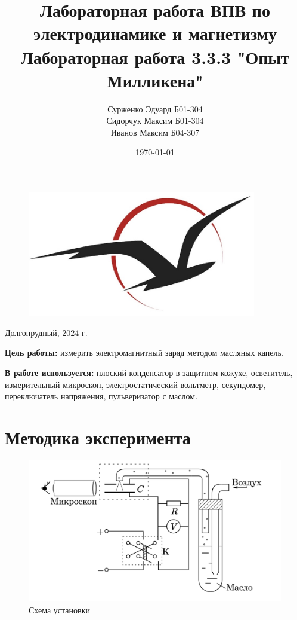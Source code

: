 \documentclass{lab}
\title {Лабораторная работа }
\author {}
\date{\today}
\begin{document}
\begin{titlepage}
    \centering
    \begin{figure}[t]
        \centering
        \includegraphics[width=100mm]{frtk-label 2.jpg}
        \label{frkt-label.jpg}
    \end{figure}

    \author{Сурженко Эдуард Б01-304 \\ Сидорчук Максим Б01-304 \\ Иванов Максим Б04-307}
    \title{ВПВ по электродинамике и магнетизму \\
    Лабораторная работа 3.3.3 "Опыт Милликена"}
    \date{}
    \maketitle
    \thispagestyle{empty}
    \vfill
    Долгопрудный, 2024 г.

\end{titlepage}
\newpage

\textbf{Цель работы:} измерить электромагнитный заряд методом масляных капель.
\par
\textbf{В работе используется:} плоский конденсатор в защитном кожухе, осветитель, измерительный микроскоп, электростатический вольтметр, секундомер, переключатель напряжения, пульверизатор с маслом.
\section{Методика эксперимента}
\begin{figure}[h!]
    \centering
    \includegraphics[width=0.8\linewidth]{Снимок экрана 2024-12-24 в 19.44.51.png}
    \caption{Схема установки}
    \label{fig:ustan}
\end{figure}
\end{document}
